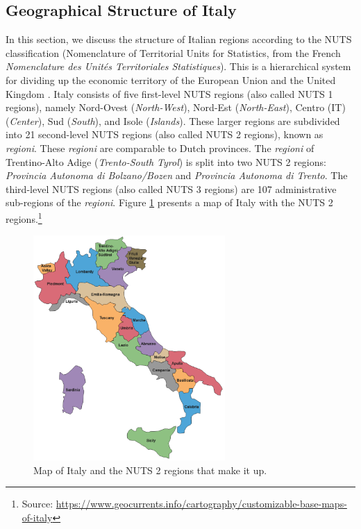 \documentclass[12pt]{article}
\begin{document}
	\subsection{Geographical Structure of Italy} \label{subsec:italy_geography}
	In this section, we discuss the structure of Italian regions according to the NUTS classification (Nomenclature of Territorial Units for Statistics, from the French \textit{Nomenclature des Unités Territoriales Statistiques}). This is a hierarchical system for dividing up the economic territory of the European Union and the United Kingdom \parencite{background-nuts}. Italy consists of five first-level NUTS regions (also called NUTS 1 regions), namely Nord-Ovest (\textit{North-West}), Nord-Est (\textit{North-East}), Centro (IT) (\textit{Center}), Sud (\textit{South}), and Isole (\textit{Islands}). These larger regions are subdivided into 21 second-level NUTS regions (also called NUTS 2 regions), known as \textit{regioni}. These \textit{regioni} are comparable to Dutch provinces. The \textit{regioni} of Trentino-Alto Adige (\textit{Trento-South Tyrol}) is split into two NUTS 2 regions: \textit{Provincia Autonoma di Bolzano/Bozen} and \textit{Provincia Autonoma di Trento}. The third-level NUTS regions (also called NUTS 3 regions) are 107 administrative sub-regions of the \textit{regioni}. Figure \ref{fig:map_italy} presents a map of Italy with the NUTS 2 regions.\footnote{Source: \url{https://www.geocurrents.info/cartography/customizable-base-maps-of-italy}}
	
	\begin{figure}[H]
	    \centering
	    \includegraphics[width=0.65\textwidth]{output/Italy-Map.pdf}
	    \caption{Map of Italy and the NUTS 2 regions that make it up.}
	    \label{fig:map_italy}
	\end{figure}
	
\end{document}
